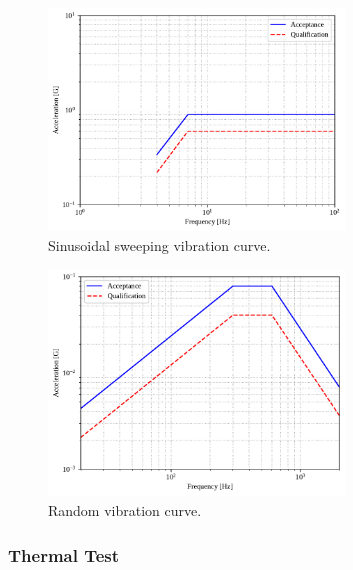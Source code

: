 
\begin{figure}[!ht]
    \begin{center}
        \includegraphics[width=0.7\textwidth]{figures/sine_test.pdf}
        \caption{Sinusoidal sweeping vibration curve.}
        \label{fig:vibration-sinusoidal-curve}
    \end{center}
\end{figure}

\begin{figure}[!ht]
    \begin{center}
        \includegraphics[width=0.7\textwidth]{figures/random_vibration.pdf}
        \caption{Random vibration curve.}
        \label{fig:vibration-test}
    \end{center}
\end{figure}

\subsubsection{Thermal Test}


